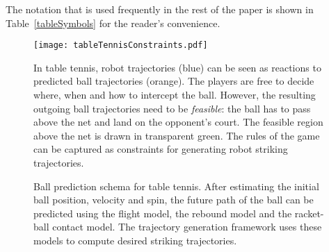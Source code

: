 The notation that is used frequently in the rest of the paper is shown in Table~\ref{tableSymbols} for the reader's convenience.
%
\begin{figure}
	\centering
	\texttt{[image: tableTennisConstraints.pdf]}%
	\caption{In table tennis, robot trajectories (blue) can be seen as reactions to predicted ball trajectories (orange). The players are free to decide where, when and how to intercept the ball. However, the resulting outgoing ball trajectories need to be \emph{feasible}: the ball has to pass above the net and land on the opponent's court. The feasible region above the net is drawn in transparent green. The rules of the game can be captured as constraints for generating robot striking trajectories.}
	\label{tableTennisConstraints}
\end{figure}
%
%
\begin{figure*}
	\centering
	\def\svgwidth{2.0\columnwidth}
	
	\caption{Ball prediction schema for table tennis. After estimating the initial ball position, velocity and spin, the future path of the ball can be predicted using the flight model, the rebound model and the racket-ball contact model. The trajectory generation framework uses these models to compute desired striking trajectories.}
	\label{tableTennisSchema}
\end{figure*}
%
%
